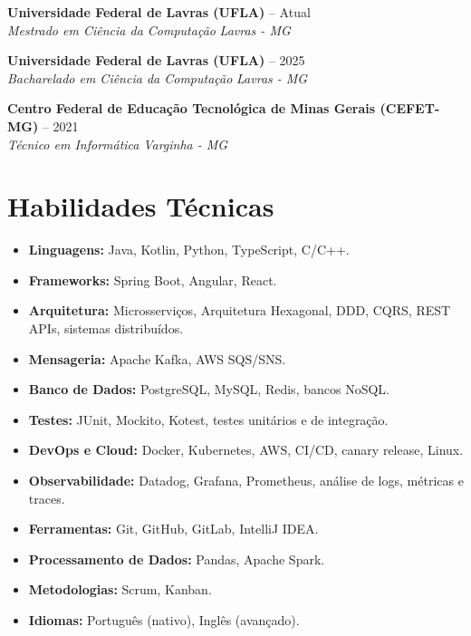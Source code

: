 \documentclass[a4paper,10pt]{article}
\newcommand{\entry}[4]{
  \noindent\textbf{#1} \hfill #2 \\
  \noindent\textit{#3} \hfill \textit{#4} \\
  \vspace{2pt}
}
\begin{document}
\entry{Universidade Federal de Lavras (UFLA)}{\faCalendar \space 2026 -- Atual}{Mestrado em Ciência da Computação}{\faMapMarker \space Lavras - MG}

\entry{Universidade Federal de Lavras (UFLA)}{\faCalendar \space 2022 -- 2025}{Bacharelado em Ciência da Computação}{\faMapMarker \space Lavras - MG}

\entry{Centro Federal de Educação Tecnológica de Minas Gerais (CEFET-MG)}{\faCalendar \space 2019 -- 2021}{Técnico em Informática}{\faMapMarker \space Varginha - MG}

\section*{Habilidades Técnicas}
\vspace{0.6em}
\begin{itemize}
\setlength\itemsep{0em}
\item \textbf{Linguagens:} Java, Kotlin, Python, TypeScript, C/C++.
\item \textbf{Frameworks:} Spring Boot, Angular, React.
\item \textbf{Arquitetura:} Microsserviços, Arquitetura Hexagonal, DDD, CQRS, REST APIs, sistemas distribuídos.
\item \textbf{Mensageria:} Apache Kafka, AWS SQS/SNS.
\item \textbf{Banco de Dados:} PostgreSQL, MySQL, Redis, bancos NoSQL.
\item \textbf{Testes:} JUnit, Mockito, Kotest, testes unitários e de integração.
\item \textbf{DevOps e Cloud:} Docker, Kubernetes, AWS, CI/CD, canary release, Linux.
\item \textbf{Observabilidade:} Datadog, Grafana, Prometheus, análise de logs, métricas e traces.
\item \textbf{Ferramentas:} Git, GitHub, GitLab, IntelliJ IDEA.
\item \textbf{Processamento de Dados:} Pandas, Apache Spark.
\item \textbf{Metodologias:} Scrum, Kanban.
\item \textbf{Idiomas:} Português (nativo), Inglês (avançado).
\end{itemize}
\end{document}
